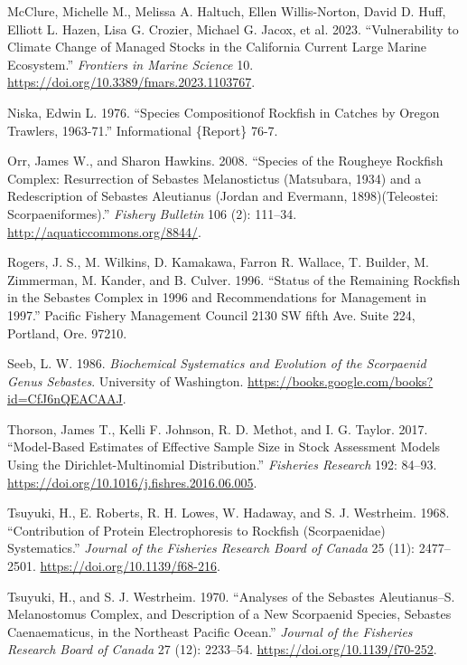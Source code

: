 \documentclass[
]{scrartcl}
\newlength{\cslhangindent}
\newenvironment{CSLReferences}[2] %
 {\begin{list}{}{%
  \setlength{\itemindent}{0pt}
  \setlength{\leftmargin}{0pt}
  \setlength{\parsep}{0pt}
  \ifodd #1
   \setlength{\leftmargin}{\cslhangindent}
   \setlength{\itemindent}{-1\cslhangindent}
  \fi
  \setlength{\itemsep}{#2\baselineskip}}}
 {\end{list}}
\begin{document}
\begin{CSLReferences}{1}{0}
McClure, Michelle M., Melissa A. Haltuch, Ellen Willis-Norton, David D.
Huff, Elliott L. Hazen, Lisa G. Crozier, Michael G. Jacox, et al. 2023.
{``Vulnerability to Climate Change of Managed Stocks in the {California
Current} Large Marine Ecosystem.''} \emph{Frontiers in Marine Science}
10. \url{https://doi.org/10.3389/fmars.2023.1103767}.

Niska, Edwin L. 1976. {``Species {Compositionof} Rockfish in Catches by
{Oregon} {Trawlers}, 1963-71.''} Informational \{Report\} 76-7.

Orr, James W., and Sharon Hawkins. 2008. {``Species of the Rougheye
Rockfish Complex: Resurrection of {Sebastes} Melanostictus ({Matsubara},
1934) and a Redescription of {Sebastes} Aleutianus ({Jordan} and
{Evermann}, 1898)({Teleostei}: {Scorpaeniformes}).''} \emph{Fishery
Bulletin} 106 (2): 111--34. \url{http://aquaticcommons.org/8844/}.

Rogers, J. S., M. Wilkins, D. Kamakawa, Farron R. Wallace, T. Builder,
M. Zimmerman, M. Kander, and B. Culver. 1996. {``Status of the
{Remaining} {Rockfish} in the {Sebastes} {Complex} in 1996 and
Recommendations for Management in 1997.''} Pacific Fishery Management
Council 2130 SW fifth Ave. Suite 224, Portland, Ore. 97210.

Seeb, L. W. 1986. \emph{Biochemical {Systematics} and {Evolution} of the
{Scorpaenid} {Genus} {Sebastes}}. University of Washington.
\url{https://books.google.com/books?id=CfJ6nQEACAAJ}.

Thorson, James T., Kelli F. Johnson, R. D. Methot, and I. G. Taylor.
2017. {``Model-Based Estimates of Effective Sample Size in Stock
Assessment Models Using the {Dirichlet}-Multinomial Distribution.''}
\emph{Fisheries Research} 192: 84--93.
\url{https://doi.org/10.1016/j.fishres.2016.06.005}.

Tsuyuki, H., E. Roberts, R. H. Lowes, W. Hadaway, and S. J. Westrheim.
1968. {``Contribution of {Protein} {Electrophoresis} to {Rockfish}
({Scorpaenidae}) {Systematics}.''} \emph{Journal of the Fisheries
Research Board of Canada} 25 (11): 2477--2501.
\url{https://doi.org/10.1139/f68-216}.

Tsuyuki, H., and S. J. Westrheim. 1970. {``Analyses of the {Sebastes}
Aleutianus--{S}. Melanostomus {Complex}, and {Description} of a New
{Scorpaenid} {Species}, {Sebastes} Caenaematicus, in the {Northeast}
{Pacific} {Ocean}.''} \emph{Journal of the Fisheries Research Board of
Canada} 27 (12): 2233--54. \url{https://doi.org/10.1139/f70-252}.

\end{CSLReferences}
\end{document}
